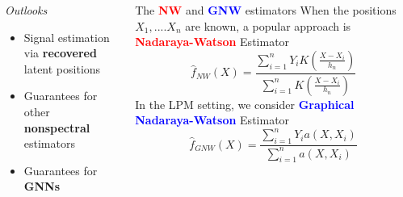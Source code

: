 \documentclass[final,dvipsnames]{beamer}
\newcommand{\myemphh}[1]{\textbf{\textcolor{blue}{#1}}}
\newcommand{\myemphr}[1]{\textbf{\textcolor{red}{#1}}}
\begin{document}
\begin{frame}
\begin{columns}[T]
\begin{column}{0.49\textwidth}
\begin{block}{\textit{Outlooks}}
    \begin{itemize}
        \item Signal estimation via \textbf{recovered} latent positions
        \item Guarantees for other \textbf{nonspectral} estimators
        \item Guarantees for \textbf{GNNs}
    \end{itemize}
\end{block}
\end{column}


\begin{column}{0.49\textwidth}
\begin{block}{The \myemphr{NW} and \myemphh{GNW} estimators}
When the positions $X_1,....X_n$ are known, a popular approach is \myemphr{Nadaraya-Watson} Estimator
\begin{equation*}
    \hat{f}_{NW}(X)=\frac{\sum_{i=1}^n Y_iK(\frac{X-X_i}{h_n})}{\sum_{i=1}^n K(\frac{X-X_i}{h_n})}
    \end{equation*}
In the LPM setting, we consider 
\myemphh{Graphical Nadaraya-Watson} Estimator
    \begin{equation*}
        \hat{f}_{GNW}(X)=\frac{\sum_{i=1}^n Y_i a(X,X_i)}{\sum_{i=1}^n a(X,X_i)}
    \end{equation*}


\end{block}
\end{column}
\end{columns}
\end{frame}
\end{document}
